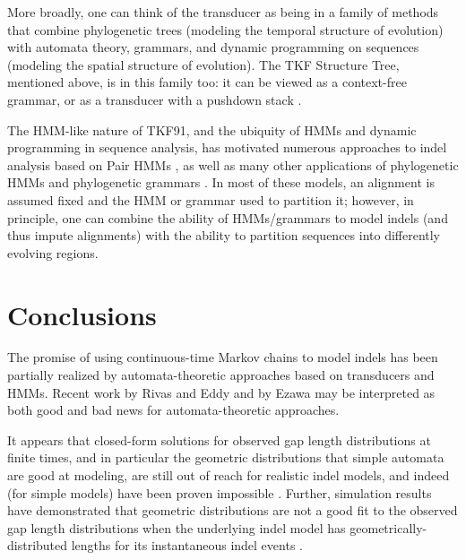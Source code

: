 \documentclass{bmcart}
\begin{document}
More broadly, one can think of the transducer as being in a family of methods
that combine phylogenetic trees (modeling the temporal structure of evolution)
with automata theory, grammars, and dynamic programming on sequences (modeling the spatial structure of evolution).
The TKF Structure Tree, mentioned above, is in this family too:
it can be viewed as a context-free grammar, or as a transducer with a pushdown stack \cite{Holmes2004}.

The HMM-like nature of TKF91, and the ubiquity of HMMs and dynamic programming in sequence analysis,
has motivated numerous approaches to indel analysis based on Pair HMMs
\cite{ThorneEtal92,KnudsenMiyamoto2003,WangKeightleyJohnson2006,RivasEddy2008,RivasEddy2015},
as well as many other applications of 
phylogenetic HMMs \cite{FelsensteinChurchill96,GoldmanEtAl96,PedersenHein2003,SiepelHaussler04,SiepelHaussler04b}
and phylogenetic grammars \cite{KnudsenHein99,KnudsenHein2003,PedersenEtAl04,PedersenEtAl2006,KlostermanEtAl2006,pmid22693624}.
In most of these models, an alignment is assumed fixed and the HMM or grammar used to partition it;
however, in principle, one can combine the ability of HMMs/grammars to model indels (and thus impute alignments)
with the ability to partition sequences into differently evolving regions.

\section*{Conclusions}

The promise of using continuous-time Markov chains to model indels
has been partially realized by automata-theoretic approaches
based on transducers and HMMs.
Recent work by Rivas and Eddy \cite{RivasEddy2015}
and by Ezawa \cite{Ezawa2016a,Ezawa2016b,Ezawa2016bErratum}
may be interpreted as both good and bad news for automata-theoretic approaches.

It appears that closed-form solutions for observed gap length distributions at finite times,
and in particular the geometric distributions that simple automata are good at modeling,
are still out of reach for realistic indel models,
and indeed (for simple models) have been proven impossible \cite{RivasEddy2015}.
Further, simulation results have demonstrated that geometric distributions are not
a good fit to the observed gap length distributions when the underlying indel model
has geometrically-distributed lengths for its instantaneous indel events \cite{RivasEddy2015,Ezawa2016a}.
\end{document}
